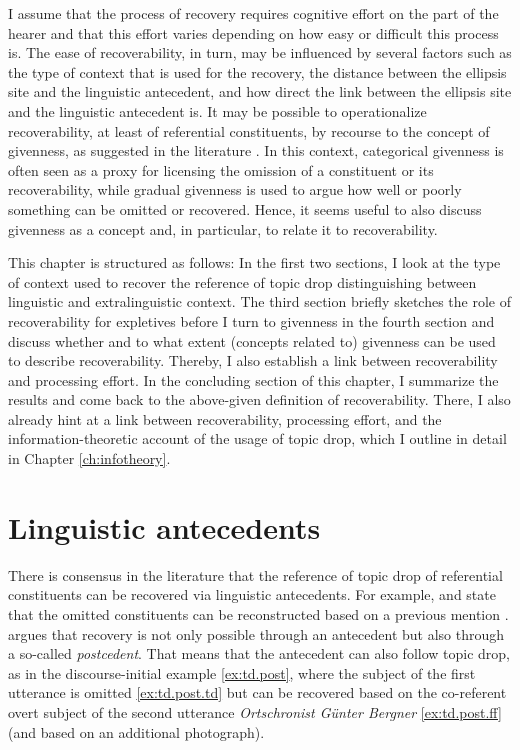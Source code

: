 I assume that the process of recovery requires cognitive effort on the part of the hearer and that this effort varies depending on how easy or difficult this process is. 
The ease of recoverability, in turn, may be influenced by several factors such as the type of context that is used for the recovery, the distance between the ellipsis site and the linguistic antecedent, and how direct the link between the ellipsis site and the linguistic antecedent is.
It may be possible to operationalize recoverability, at least of referential constituents, by recourse to the concept of givenness, as suggested in the literature \citep[e.g.,][]{fries1988,helmer2016,trutkowski2016}.
In this context, categorical givenness is often seen as a proxy for licensing the omission of a constituent or its recoverability, while gradual givenness is used to argue how well or poorly something can be omitted or recovered.
Hence, it seems useful to also discuss givenness as a concept and, in particular, to relate it to recoverability.

This chapter is structured as follows:
In the first two sections, I look at the type of context used to recover the reference of topic drop distinguishing between linguistic and extralinguistic context.
The third section briefly sketches the role of recoverability for expletives before I turn to givenness in the fourth section and discuss whether and to what extent (concepts related to) givenness can be used to describe recoverability.
Thereby, I also establish a link between recoverability and processing effort.
In the concluding section of this chapter, I summarize the results and come back to the above-given definition of recoverability.
There, I also already hint at a link between recoverability, processing effort, and the information-theoretic account of the usage of topic drop, which I outline in detail in Chapter \ref{ch:infotheory}. 

\section{Linguistic antecedents}\label{sec:recover.ling}
There is consensus in the literature that the reference of topic drop of referential constituents can be recovered via linguistic antecedents.
For example, \citet[100]{guenthner2006} and \citet[102]{schwitalla2012} state that the omitted constituents can be reconstructed based on a previous mention \citep[see also][]{fries1988, cardinaletti1990, zifonun.etal1997,volodina2011, volodina.onea2012}.
\citet[22]{trutkowski2016} argues that recovery is not only possible through an antecedent but also through a so-called \textit{postcedent}.
That means that the antecedent can also follow topic drop, as in the discourse-initial example \ref{ex:td.post}, where the subject of the first utterance is omitted \ref{ex:td.post.td} but can be recovered based on the co-referent overt subject of the second utterance \textit{Ortschronist Günter Bergner} \ref{ex:td.post.ff} (and based on an additional photograph).

